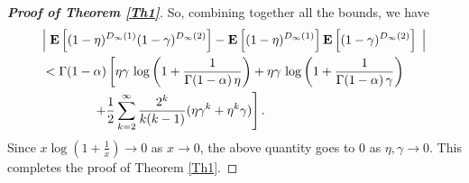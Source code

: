 \documentclass[11pt, reqno]{amsart}
\numberwithin{equation}{section}
\theoremstyle{plain} %
\theoremstyle{definition} %
\newcommand{\E}{\mathbf{E}}
\begin{document}
\begin{proof}[{\bf Proof of Theorem \ref{Th1}}]
So, combining together all the bounds, we have
\begin{equation}
    \begin{split}
    & \Big{\lvert} \; \E  \left[ (1-\eta)^{D_{\infty}(1)}(1-\gamma)^{D_\infty(2)}  \right] -  \mathbf{E} \left[ (1-\eta)^{D_\infty(1)}\right] \mathbf{E} \left[(1-\gamma)^{D_{\infty}(2) } \right]   \; \Big{\rvert} \\
        & <   \Gamma(1-\alpha)   \left[    \eta \gamma \, \log{\left(1+\frac{1}{\Gamma(1-\alpha)  \, \eta}\right)}  + \eta \gamma \, \log{\left(1+\frac{1}{\Gamma(1-\alpha) \, \gamma}\right)} \right. \\
        &\qquad \qquad \left.+  \frac{1}{2}\sum_{k=2}^{\infty} \frac{2^{k}}{k(k-1)}    (\eta \gamma^k       +   \eta^k \gamma)         \right].\\
    \end{split}
\end{equation}
Since $x\log(1+\frac{1}{x})\to 0$ as $x\to 0$,  the above quantity goes to $0$ as $\eta, \gamma\to 0$. This completes the proof of Theorem \ref{Th1}.
\end{proof}
\end{document}

